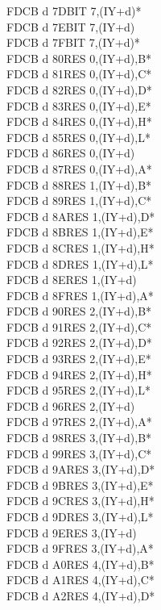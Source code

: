 \documentclass[oneside,a4paper]{book}
\begin{document}
\begin{multicols}{3}
{\begin{tabbing}
FDCB d 7D\>BIT 7,(IY+d)*\\
FDCB d 7E\>BIT 7,(IY+d)\\
FDCB d 7F\>BIT 7,(IY+d)*\\
FDCB d 80\>RES 0,(IY+d),B*\\
FDCB d 81\>RES 0,(IY+d),C*\\
FDCB d 82\>RES 0,(IY+d),D*\\
FDCB d 83\>RES 0,(IY+d),E*\\
FDCB d 84\>RES 0,(IY+d),H*\\
FDCB d 85\>RES 0,(IY+d),L*\\
FDCB d 86\>RES 0,(IY+d)\\
FDCB d 87\>RES 0,(IY+d),A*\\
FDCB d 88\>RES 1,(IY+d),B*\\
FDCB d 89\>RES 1,(IY+d),C*\\
FDCB d 8A\>RES 1,(IY+d),D*\\
FDCB d 8B\>RES 1,(IY+d),E*\\
FDCB d 8C\>RES 1,(IY+d),H*\\
FDCB d 8D\>RES 1,(IY+d),L*\\
FDCB d 8E\>RES 1,(IY+d)\\
FDCB d 8F\>RES 1,(IY+d),A*\\
FDCB d 90\>RES 2,(IY+d),B*\\
FDCB d 91\>RES 2,(IY+d),C*\\
FDCB d 92\>RES 2,(IY+d),D*\\
FDCB d 93\>RES 2,(IY+d),E*\\
FDCB d 94\>RES 2,(IY+d),H*\\
FDCB d 95\>RES 2,(IY+d),L*\\
FDCB d 96\>RES 2,(IY+d)\\
FDCB d 97\>RES 2,(IY+d),A*\\
FDCB d 98\>RES 3,(IY+d),B*\\
FDCB d 99\>RES 3,(IY+d),C*\\
FDCB d 9A\>RES 3,(IY+d),D*\\
FDCB d 9B\>RES 3,(IY+d),E*\\
FDCB d 9C\>RES 3,(IY+d),H*\\
FDCB d 9D\>RES 3,(IY+d),L*\\
FDCB d 9E\>RES 3,(IY+d)\\
FDCB d 9F\>RES 3,(IY+d),A*\\
FDCB d A0\>RES 4,(IY+d),B*\\
FDCB d A1\>RES 4,(IY+d),C*\\
FDCB d A2\>RES 4,(IY+d),D*\\

\end{tabbing}}
\end{multicols}
\end{document}
